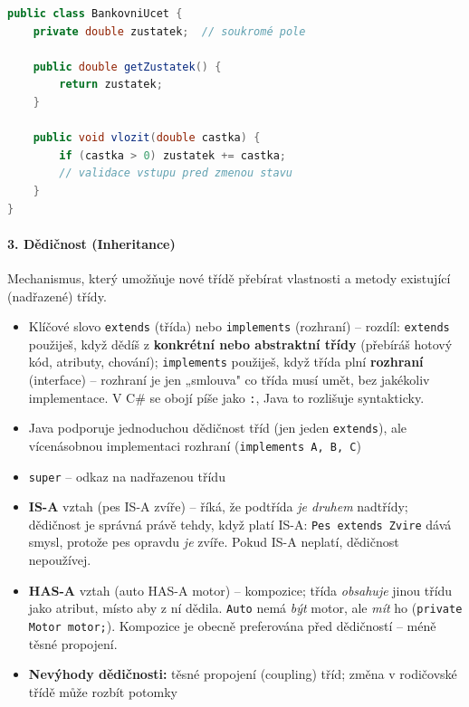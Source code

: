 \begin{lstlisting}[language=Java, caption=Zapouzdření v Javě]
public class BankovniUcet {
    private double zustatek;  // soukromé pole

    public double getZustatek() {
        return zustatek;
    }

    public void vlozit(double castka) {
        if (castka > 0) zustatek += castka;
        // validace vstupu pred zmenou stavu
    }
}
\end{lstlisting}

\paragraph{3. Dědičnost (Inheritance)}
Mechanismus, který umožňuje nové třídě přebírat vlastnosti a metody existující (nadřazené) třídy.
\begin{itemize}
  \item Klíčové slovo \texttt{extends} (třída) nebo \texttt{implements} (rozhraní) --
    rozdíl: \texttt{extends} použiješ, když dědíš z \textbf{konkrétní nebo abstraktní třídy}
    (přebíráš hotový kód, atributy, chování); \texttt{implements} použiješ, když třída
    plní \textbf{rozhraní} (interface) -- rozhraní je jen „smlouva" co třída musí umět,
    bez jakékoliv implementace. V C\# se obojí píše jako \texttt{:}, Java to rozlišuje
    syntakticky.
  \item Java podporuje jednoduchou dědičnost tříd (jen jeden \texttt{extends}), ale vícenásobnou implementaci rozhraní (\texttt{implements A, B, C})
  \item \texttt{super} -- odkaz na nadřazenou třídu
  \item \textbf{IS-A} vztah (pes IS-A zvíře) -- říká, že podtřída \textit{je druhem} nadtřídy;
    dědičnost je správná právě tehdy, když platí IS-A: \texttt{Pes extends Zvire} dává smysl,
    protože pes opravdu \textit{je} zvíře. Pokud IS-A neplatí, dědičnost nepoužívej.
  \item \textbf{HAS-A} vztah (auto HAS-A motor) -- kompozice; třída \textit{obsahuje} jinou třídu
    jako atribut, místo aby z ní dědila. \texttt{Auto} nemá \textit{být} motor, ale \textit{mít} ho
    (\texttt{private Motor motor;}). Kompozice je obecně preferována před dědičností -- méně těsné propojení.
  \item \textbf{Nevýhody dědičnosti:} těsné propojení (coupling) tříd; změna v rodičovské třídě může rozbít potomky
\end{itemize}

